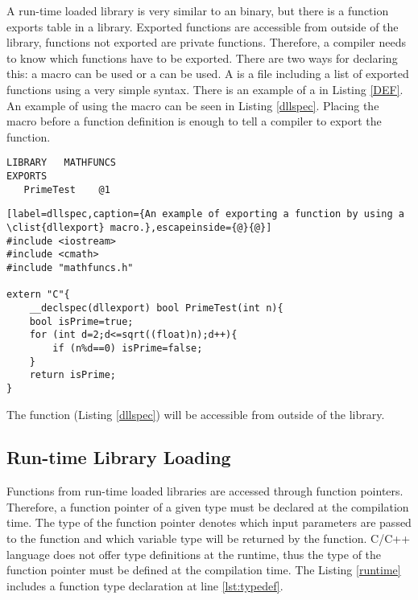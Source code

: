 A run-time loaded  library is very similar to an  binary, but there is a function exports table in a  library. Exported functions are accessible from outside of the library, functions not exported are private functions. Therefore, a compiler needs to know which functions have to be exported. There are two ways for declaring this: a  macro can be used or a  can be used. A  is a file including a list of exported functions using a very simple syntax. There is an example of a  in Listing \ref{DEF}. An example of using the  macro can be seen in Listing \ref{dllspec}. Placing the macro before a function definition is enough to tell a compiler to export the function.

\begin{lstlisting}[label=DEF,caption={A \clist{Module Definition File} of a library called ``Mathfuncs'' including a function called ``PrimeTest''.}]
LIBRARY   MATHFUNCS
EXPORTS
   PrimeTest	@1
\end{lstlisting}


\begin{lstlisting}[label=dllspec,caption={An example of exporting a function by using a \clist{dllexport} macro.},escapeinside={@}{@}]
#include <iostream>
#include <cmath>
#include "mathfuncs.h"

extern "C"{
	__declspec(dllexport) bool PrimeTest(int n){
	bool isPrime=true;
	for (int d=2;d<=sqrt((float)n);d++){
		if (n%d==0) isPrime=false;
	}
	return isPrime;
}
\end{lstlisting}

The function  (Listing \ref{dllspec}) will be accessible from outside of the library.

\subsection{Run-time Library Loading}

\label{sec:runtimeloading}

Functions from run-time loaded libraries are accessed through function pointers. Therefore, a function pointer of a given type must be declared at the compilation time. The type of the function pointer denotes which input parameters are passed to the function and which variable type will be returned by the function. C/C++ language does not offer type definitions at the runtime, thus the type of the function pointer must be defined at the compilation time. The Listing \ref{runtime} includes a function type declaration at line \ref{lst:typedef}.

